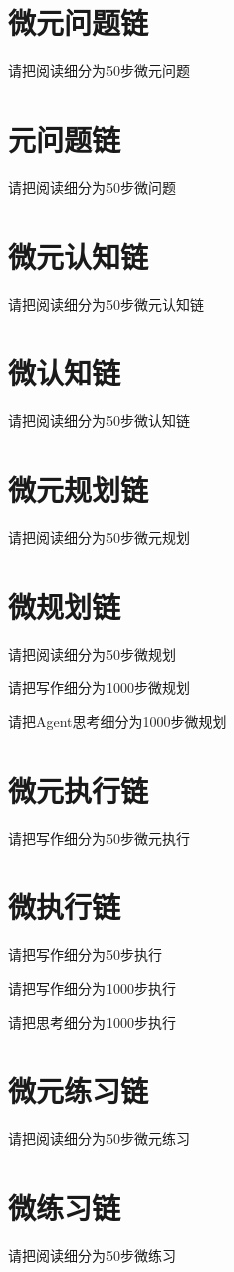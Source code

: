\documentclass[12pt]{book}
\begin{document}
\section{微元问题链}
请把阅读细分为50步微元问题

\section{元问题链}
请把阅读细分为50步微问题

\section{微元认知链}
请把阅读细分为50步微元认知链

\section{微认知链}
请把阅读细分为50步微认知链

\section{微元规划链}
请把阅读细分为50步微元规划

\section{微规划链}
请把阅读细分为50步微规划

请把写作细分为1000步微规划

请把Agent思考细分为1000步微规划

\section{微元执行链}
请把写作细分为50步微元执行

\section{微执行链}
请把写作细分为50步执行

请把写作细分为1000步执行

请把思考细分为1000步执行

\section{微元练习链}
请把阅读细分为50步微元练习

\section{微练习链}
请把阅读细分为50步微练习
\end{document}
